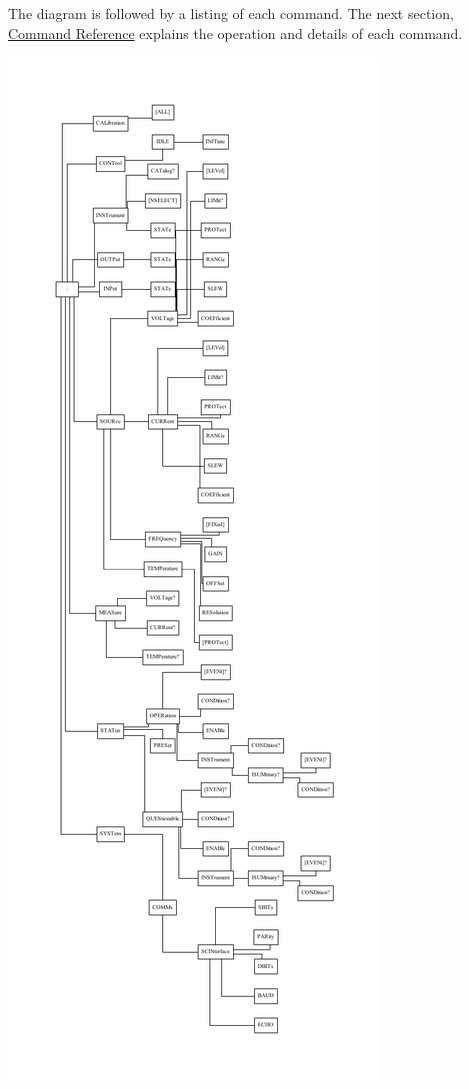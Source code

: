 The diagram is followed by a listing of each command. The next section, \hyperlink{a00001}{Command Reference} explains the operation and details of each command.

\begin{center}

\begin{DoxyImageNoCaption}
  \mbox{\includegraphics[width=\textwidth,height=\textheight/2,keepaspectratio=true]{dot_inline_dotgraph_2}}
\end{DoxyImageNoCaption}
\end{center}



